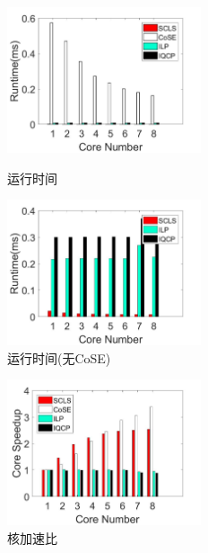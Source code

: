 \begin{figure}[htbp]
\centering
\begin{minipage}[t]{0.3\linewidth}
\centering
\includegraphics[width=2.25in]{figures/runtime}
\caption{运行时间}
\label{fig:normalization runtime}
\end{minipage}
\hfill
\begin{minipage}[t]{0.3\linewidth}
\centering
\includegraphics[width=2.25in]{figures/Runtime_noKSP_noCOSE}\\
  \caption{运行时间(无CoSE)}\label{fig:Runtime_noKSP_noCOSE}
\end{minipage}
\hfill
\begin{minipage}[t]{0.3\linewidth}
\centering
\includegraphics[width=2.25in]{figures/speedup}
\caption{核加速比}
\label{fig:Speedup}
\end{minipage}
\end{figure}


